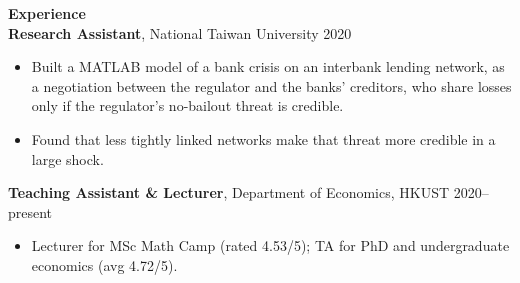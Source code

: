 \documentclass[11pt,letterpaper]{article}
\begin{document}
{\large \textbf{Experience}}\\[1pt]
\textbf{Research Assistant}, National Taiwan University \hfill 2020\\
\vspace{1pt}
\begin{itemize}
  \item Built a MATLAB model of a bank crisis on an interbank lending network, as a negotiation between the regulator and the banks' creditors, who share losses only if the regulator's no-bailout threat is credible.
  \item Found that less tightly linked networks make that threat more credible in a large shock.
\end{itemize}
\textbf{Teaching Assistant \& Lecturer}, Department of Economics, HKUST \hfill 2020--present\\
\vspace{1pt}
\begin{itemize}
  \item Lecturer for MSc Math Camp (rated 4.53/5); TA for PhD and undergraduate economics (avg 4.72/5).
\end{itemize}

\vspace{1pt}
\end{document}
